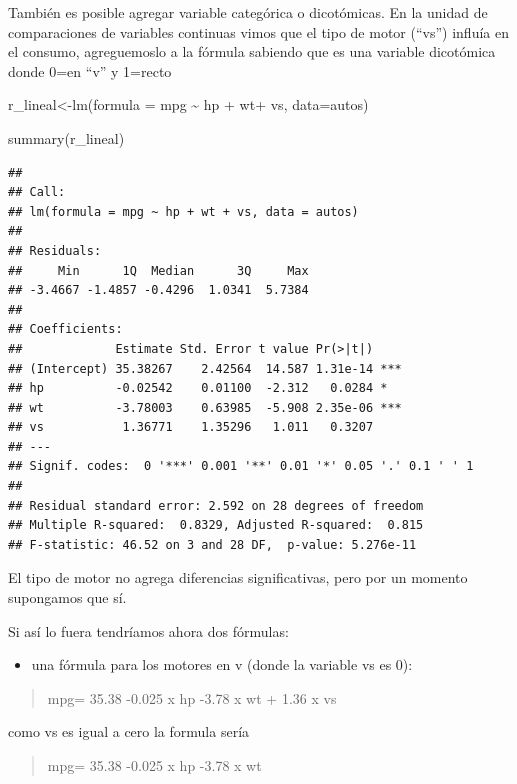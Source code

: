 \documentclass[
]{book}
\newenvironment{Shaded}{\begin{snugshade}}{\end{snugshade}}
\newcommand{\AttributeTok}[1]{\textcolor[rgb]{0.77,0.63,0.00}{#1}}
\newcommand{\FunctionTok}[1]{\textcolor[rgb]{0.00,0.00,0.00}{#1}}
\newcommand{\NormalTok}[1]{#1}
\newcommand{\OtherTok}[1]{\textcolor[rgb]{0.56,0.35,0.01}{#1}}
\newcommand{\SpecialCharTok}[1]{\textcolor[rgb]{0.00,0.00,0.00}{#1}}
\providecommand{\tightlist}{%
  \setlength{\itemsep}{0pt}\setlength{\parskip}{0pt}}
\begin{document}
También es posible agregar variable categórica o dicotómicas. En la unidad de comparaciones de variables continuas vimos que el tipo de motor (``vs'') influía en el consumo, agreguemoslo a la fórmula sabiendo que es una variable dicotómica donde 0=en ``v'' y 1=recto

\begin{Shaded}
\begin{Highlighting}[]
\NormalTok{r\_lineal}\OtherTok{\textless{}{-}}\FunctionTok{lm}\NormalTok{(}\AttributeTok{formula =}\NormalTok{ mpg }\SpecialCharTok{\textasciitilde{}}\NormalTok{ hp }\SpecialCharTok{+}\NormalTok{ wt}\SpecialCharTok{+}\NormalTok{ vs, }\AttributeTok{data=}\NormalTok{autos)}

\FunctionTok{summary}\NormalTok{(r\_lineal)}
\end{Highlighting}
\end{Shaded}

\begin{verbatim}
## 
## Call:
## lm(formula = mpg ~ hp + wt + vs, data = autos)
## 
## Residuals:
##     Min      1Q  Median      3Q     Max 
## -3.4667 -1.4857 -0.4296  1.0341  5.7384 
## 
## Coefficients:
##             Estimate Std. Error t value Pr(>|t|)    
## (Intercept) 35.38267    2.42564  14.587 1.31e-14 ***
## hp          -0.02542    0.01100  -2.312   0.0284 *  
## wt          -3.78003    0.63985  -5.908 2.35e-06 ***
## vs           1.36771    1.35296   1.011   0.3207    
## ---
## Signif. codes:  0 '***' 0.001 '**' 0.01 '*' 0.05 '.' 0.1 ' ' 1
## 
## Residual standard error: 2.592 on 28 degrees of freedom
## Multiple R-squared:  0.8329, Adjusted R-squared:  0.815 
## F-statistic: 46.52 on 3 and 28 DF,  p-value: 5.276e-11
\end{verbatim}

El tipo de motor no agrega diferencias significativas, pero por un momento supongamos que sí.

Si así lo fuera tendríamos ahora dos fórmulas:

\begin{itemize}
\tightlist
\item
  una fórmula para los motores en v (donde la variable vs es 0):
\end{itemize}

\begin{quote}
mpg= 35.38 -0.025 x hp -3.78 x wt + 1.36 x vs
\end{quote}

como vs es igual a cero la formula sería

\begin{quote}
mpg= 35.38 -0.025 x hp -3.78 x wt
\end{quote}
\end{document}
